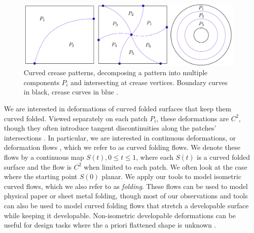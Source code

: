 \begin{figure} [h]
	\centering
	\includegraphics[width=\linewidth]{figures/crease_patterns}
	\caption{Curved crease patterns, decomposing a pattern into multiple components $P_i$ and intersecting at crease vertices. Boundary curves in black, crease curves in blue .}
	\label{fig:crease_pattern}
\end{figure}

We are interested in deformations of curved folded surfaces that keep them curved folded. Viewed separately on each patch $P_i$, these deformations are $C^2$, though they often introduce tangent discontinuities along the patches' intersections . In particular, we are interested in continuous deformations, or deformation flows \cite{rabi2018shape}, which we refer to as curved folding flows. We denote these flows by a continuous map $S(t), 0 \leq t \leq 1$, where each $S(t)$ is a curved folded surface and the flow is $C^2$ when limited to each patch. We often look at the case where the starting point $S(0)$ planar. We apply our tools to model isometric curved flows, which we also refer to as \emph{folding}. These flows can be used to model physical paper or sheet metal folding, though most of our observations and tools can also be used to model curved folding flows that stretch a developable surface while keeping it developable. Non-isometric developable deformations can be useful for design tasks where the a priori flattened shape is unknown \cite{rabi18,rabi2018shape,pottmann_new}.  

